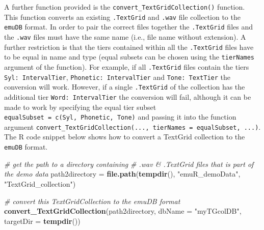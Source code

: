 \documentclass[]{book}
\newenvironment{Shaded}{\begin{snugshade}}{\end{snugshade}}
\newcommand{\CommentTok}[1]{\textcolor[rgb]{0.56,0.35,0.01}{\textit{#1}}}
\newcommand{\DataTypeTok}[1]{\textcolor[rgb]{0.13,0.29,0.53}{#1}}
\newcommand{\KeywordTok}[1]{\textcolor[rgb]{0.13,0.29,0.53}{\textbf{#1}}}
\newcommand{\NormalTok}[1]{#1}
\newcommand{\StringTok}[1]{\textcolor[rgb]{0.31,0.60,0.02}{#1}}
\begin{document}
A further function provided is the \texttt{convert\_TextGridCollection()} function. This function converts an existing \texttt{.TextGrid} and \texttt{.wav} file collection to the \texttt{emuDB} format. In order to pair the correct files together the \texttt{.TextGrid} files and the \texttt{.wav} files must have the same name (i.e., file name without extension). A further restriction is that the tiers contained within all the \texttt{.TextGrid} files have to be equal in name and type (equal subsets can be chosen using the \texttt{tierNames} argument of the function). For example, if all \texttt{.TextGrid} files contain the tiers \texttt{Syl:\ IntervalTier}, \texttt{Phonetic:\ IntervalTier} and \texttt{Tone:\ TextTier} the conversion will work. However, if a single \texttt{.TextGrid} of the collection has the additional tier \texttt{Word:\ IntervalTier} the conversion will fail, although it can be made to work by specifying the equal tier subset \texttt{equalSubset\ =\ c(\textquotesingle{}Syl\textquotesingle{},\ \textquotesingle{}Phonetic\textquotesingle{},\ \textquotesingle{}Tone\textquotesingle{})} and passing it into the function argument \texttt{convert\_TextGridCollection(...,\ tierNames\ =\ equalSubset,\ ...)}. The R code snippet below shows how to convert a TextGrid collection to the \texttt{emuDB} format.

\begin{Shaded}
\begin{Highlighting}[]
\CommentTok{# get the path to a directory containing}
\CommentTok{# .wav & .TextGrid files that is part of the demo data}
\NormalTok{path2directory =}\StringTok{ }\KeywordTok{file.path}\NormalTok{(}\KeywordTok{tempdir}\NormalTok{(),}
                           \StringTok{"emuR_demoData"}\NormalTok{,}
                           \StringTok{"TextGrid_collection"}\NormalTok{)}

\CommentTok{# convert this TextGridCollection to the emuDB format}
\KeywordTok{convert_TextGridCollection}\NormalTok{(path2directory, }
                           \DataTypeTok{dbName =} \StringTok{"myTGcolDB"}\NormalTok{,}
                           \DataTypeTok{targetDir =} \KeywordTok{tempdir}\NormalTok{())}
\end{Highlighting}
\end{Shaded}
\end{document}

